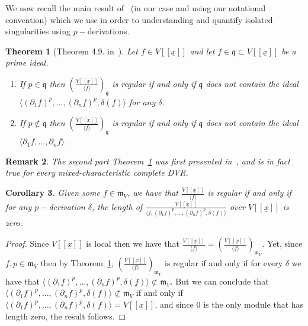 \documentclass{article}
\newtheorem{theorem}{Theorem}
\newtheorem{remark}[theorem]{Remark}
\newtheorem{corollary}[theorem]{Corollary}
\newcommand{\maxV}{\mathfrak{m}_V}
\newcommand{\Vx}{V[[\underline{x}]]}
\numberwithin{theorem}{section}
\begin{document}
We now recall the main result of~\cite{hochster2021jacobian} (in our case and using our notational convention) which we use in order to understanding and quantify isolated singularities using $p-$derivations.

\begin{theorem}[Theorem 4.9. in~\cite{hochster2021jacobian}]\label{thm:J_smooth}
    Let $f \in \Vx$ and let $f \in \mathfrak{q} \subset \Vx$ be a prime ideal. 
    \begin{enumerate}
        \item If $p \in \mathfrak{q}$ then $\left(\frac{\Vx}{\langle f \rangle}\right)_{\mathfrak{q}}$ is regular if and only if $\mathfrak{q}$ does not contain the ideal $\langle \left(\partial_1 f\right)^p, \dots, \left(\partial_n f\right)^p, \delta\left(f\right) \rangle$ for any $\delta$. 
        \item If $p \notin \mathfrak{q}$ then $\left(\frac{\Vx}{\langle f \rangle}\right)_{\mathfrak{q}}$ is regular if and only if $\mathfrak{q}$ does not contain the ideal $\langle \partial_1 f, \dots, \partial_n f \rangle$. 
    \end{enumerate}
\end{theorem}

\begin{remark}\label{rem:nagata}
    \textup{The second part Theorem~\ref{thm:J_smooth} was first presented in~\cite{nagata1958general}, and is in fact true for every mixed-characteristic complete DVR. }
\end{remark}

\begin{corollary}\label{cor:regular_length_zero}
    Given some $f \in \maxV$, we have that $\frac{\Vx}{\langle f \rangle}$ is regular  if and only if for any $p-$derivation $\delta$, the length of $\frac{\Vx}{\langle f,  \left(\partial_1 f\right)^p, \dots, \left(\partial_n f\right)^p, \delta\left(f\right) \rangle}$ over $\Vx$ is zero.
\end{corollary}

\begin{proof}
    Since $\Vx$ is local then we have that $\frac{\Vx}{\langle f \rangle} = \left(\frac{\Vx}{\langle f \rangle}\right)_{\maxV}$. Yet, since $f, p \in \maxV$ then by Theorem~\ref{thm:J_smooth}, $ \left(\frac{\Vx}{\langle f \rangle}\right)_{\maxV}$ is regular if and only if for every $\delta$ we have that $\langle \left(\partial_1 f\right)^p, \dots, \left(\partial_n f\right)^p, \delta\left(f\right) \rangle \not\subset \maxV$. But we can conclude that $\langle \left(\partial_1 f\right)^p, \dots, \left(\partial_n f\right)^p, \delta\left(f\right) \rangle \not\subset \maxV$ if and only if $\langle \left(\partial_1 f\right)^p, \dots, \left(\partial_n f\right)^p, \delta\left(f\right) \rangle = \Vx$, and since $0$ is the only module that has length zero, the result follows. 
\end{proof}
\end{document}
